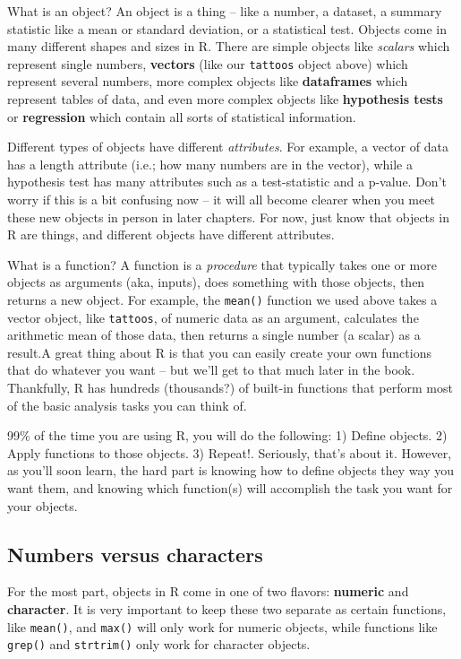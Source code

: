 \documentclass[]{book}
\theoremstyle{definition}
\theoremstyle{definition}
\theoremstyle{remark}
\begin{document}
What is an object? An object is a thing -- like a number, a dataset, a
summary statistic like a mean or standard deviation, or a statistical
test. Objects come in many different shapes and sizes in R. There are
simple objects like \textit{scalars} which represent single numbers,
\textbf{vectors} (like our \texttt{tattoos} object above) which
represent several numbers, more complex objects like \textbf{dataframes}
which represent tables of data, and even more complex objects like
\textbf{hypothesis tests} or \textbf{regression} which contain all sorts
of statistical information.

Different types of objects have different \emph{attributes}. For
example, a vector of data has a length attribute (i.e.; how many numbers
are in the vector), while a hypothesis test has many attributes such as
a test-statistic and a p-value. Don't worry if this is a bit confusing
now -- it will all become clearer when you meet these new objects in
person in later chapters. For now, just know that objects in R are
things, and different objects have different attributes.

What is a function? A function is a \emph{procedure} that typically
takes one or more objects as arguments (aka, inputs), does something
with those objects, then returns a new object. For example, the
\texttt{mean()} function we used above takes a vector object, like
\texttt{tattoos}, of numeric data as an argument, calculates the
arithmetic mean of those data, then returns a single number (a scalar)
as a result.A great thing about R is that you can easily create your own
functions that do whatever you want -- but we'll get to that much later
in the book. Thankfully, R has hundreds (thousands?) of built-in
functions that perform most of the basic analysis tasks you can think
of.

99\% of the time you are using R, you will do the following: 1) Define
objects. 2) Apply functions to those objects. 3) Repeat!. Seriously,
that's about it. However, as you'll soon learn, the hard part is knowing
how to define objects they way you want them, and knowing which
function(s) will accomplish the task you want for your objects.

\subsection{Numbers versus characters}\label{numbers-versus-characters}

For the most part, objects in R come in one of two flavors:
\textbf{numeric} and \textbf{character}. It is very important to keep
these two separate as certain functions, like \texttt{mean()}, and
\texttt{max()} will only work for numeric objects, while functions like
\texttt{grep()} and \texttt{strtrim()} only work for character objects.
\end{document}
